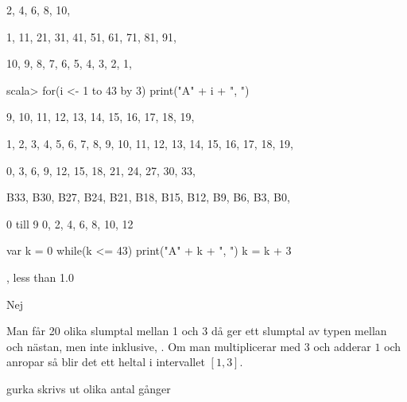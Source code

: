 {{2, 4, 6, 8, 10,

1, 11, 21, 31, 41, 51, 61, 71, 81, 91,

10, 9, 8, 7, 6, 5, 4, 3, 2, 1,

\Subtask 

\begin{REPLnonum}
scala> for(i <- 1 to 43 by 3) print("A" + i + ", ")
\end{REPLnonum}

\Task %

\Subtask 

9, 10, 11, 12, 13, 14, 15, 16, 17, 18, 19,

1, 2, 3, 4, 5, 6, 7, 8, 9, 10, 11, 12, 13, 14, 15, 16, 17, 18, 19,

0, 3, 6, 9, 12, 15, 18, 21, 24, 27, 30, 33,

\Subtask 

B33, B30, B27, B24, B21, B18, B15, B12, B9, B6, B3, B0,

\Task %

\Subtask 

0 till 9
0, 2, 4, 6, 8, 10, 12

\Subtask 

\begin{REPLnonum}
var k = 0
while(k <= 43)
{
print("A" + k + ", ")
k = k + 3
}
\end{REPLnonum}

\Subtask {}

\Task %

\Subtask  {}

, less than 1.0

\Subtask  Nej

\Subtask Man får 20 olika slumptal mellan 1 och 3 då  ger ett slumptal av typen  mellan  och nästan, men inte inklusive, . Om man multiplicerar med $3$ och adderar $1$ och anropar  så blir det ett heltal i intervallet $[1, 3]$.    

\Subtask {}

\Subtask {}

\Subtask {}

\Subtask  gurka skrivs ut olika antal gånger

\Subtask {}

}}
